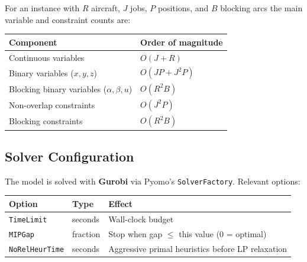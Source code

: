 For an instance with $R$ aircraft, $J$ jobs, $P$ positions, and $B$ blocking
arcs the main variable and constraint counts are:

\begin{center}
\begin{tabular}{ll}
\toprule
Component & Order of magnitude \\
\midrule
Continuous variables & $O(J + R)$ \\
Binary variables ($x, y, z$) & $O(JP + J^2 P)$ \\
Blocking binary variables ($\alpha,\beta,u$) & $O(R^2 B)$ \\
Non-overlap constraints & $O(J^2 P)$ \\
Blocking constraints & $O(R^2 B)$ \\
\bottomrule
\end{tabular}
\end{center}

\subsection{Solver Configuration}

The model is solved with \textbf{Gurobi} via Pyomo's \texttt{SolverFactory}.
Relevant options:

\begin{center}
\begin{tabular}{lll}
\toprule
Option & Type & Effect \\
\midrule
\texttt{TimeLimit} & seconds & Wall-clock budget \\
\texttt{MIPGap} & fraction & Stop when gap $\leq$ this value (0 = optimal) \\
\texttt{NoRelHeurTime} & seconds & Aggressive primal heuristics before LP relaxation \\
\bottomrule
\end{tabular}
\end{center}
